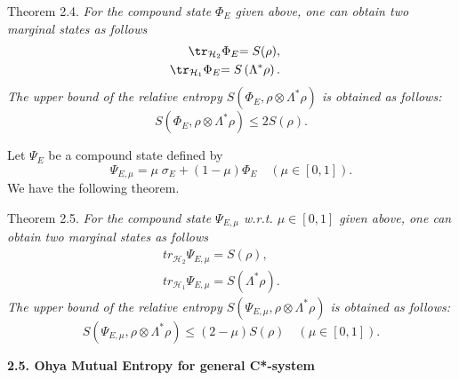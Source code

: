\smallskip

{\small\sc Theorem 2.4.} {\it
    {For the compound state  } $  {\Phi _{E}} $  given above, one can  obtain  two  marginal  states  as  follows 
\begin{eqnarray*}
{\tr_{{\mathcal{H}}_{2}}\Phi _{E}}{=S( \rho), } && \\
{\tr_{{\mathcal{H}}_{1}}\Phi _{E}}{=S\left( \Lambda ^{\ast }\rho \right).} &&
\end{eqnarray*}%
The upper bound of the relative entropy  $  S{\left( \Phi _{E},\rho \otimes
\Lambda ^{\ast }\rho \right) } $   is obtained as follows:%
\[
S{\left( \Phi _{E},\rho \otimes \Lambda ^{\ast }\rho \right) \leq 2S\left(
\rho \right).}
\]
}

\smallskip

{Let} $ \Psi _{E}$  {be  a  compound%
  state  defined} {by}%
\[
{\Psi _{E,\mu }=\mu \;\sigma _{E}+\left( 1-\mu \right) \Phi _{E}{\quad }%
\left( \mu \in \left[ 0,1\right] \right).} 
\]%
We have the following theorem.


{\small\sc Theorem 2.5.} {\it
    {For the compound state  } $  {\Psi _{E,\mu }} $  w.r.t.  $  \mu \in %
\left[ 0, 1\right]  $   given above,  one  can  obtain  two  marginal  states as  follows%
\begin{eqnarray*}
{tr_{{\mathcal{H}}_{2}}\Psi _{E,\mu }}{=S( \rho), } && \\
{tr_{{\mathcal{H}}_{1}}\Psi _{E,\mu }}{=S\left( \Lambda ^{\ast }\rho \right)
.} &&
\end{eqnarray*}%
The upper bound of the relative entropy  $  S{\left( \Psi _{E,\mu },\rho
\otimes \Lambda ^{\ast }\rho \right) } $   is obtained as follows:%
\[
S{\left( \Psi _{E,\mu },\rho \otimes \Lambda ^{\ast }\rho \right) \leq
\left( 2-\mu \right) S( \rho) \quad }\left( \mu \in \left[ 0,1%
\right] \right) {.}
\]
}

\smallskip

\textbf{2.5. Ohya Mutual Entropy for general C*-system}

